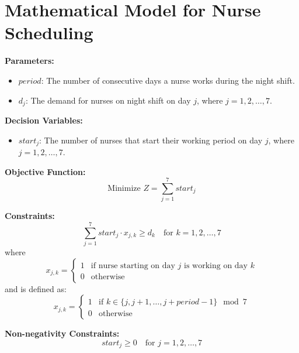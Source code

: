 \documentclass{article}
\begin{document}
\section*{Mathematical Model for Nurse Scheduling}

\textbf{Parameters:}
\begin{itemize}
    \item $period$: The number of consecutive days a nurse works during the night shift.
    \item $d_j$: The demand for nurses on night shift on day $j$, where $j = 1, 2, \ldots, 7$.
\end{itemize}

\textbf{Decision Variables:}
\begin{itemize}
    \item $start_j$: The number of nurses that start their working period on day $j$, where $j = 1, 2, \ldots, 7$.
\end{itemize}

\textbf{Objective Function:}
\[
\text{Minimize } Z = \sum_{j=1}^{7} start_j
\]

\textbf{Constraints:}
\begin{equation}
\sum_{j=1}^{7} start_j \cdot x_{j,k} \geq d_k \quad \text{for } k = 1, 2, \ldots, 7
\end{equation}
where 
\[
x_{j,k} = 
\begin{cases} 
1 & \text{if nurse starting on day } j \text{ is working on day } k \\
0 & \text{otherwise} 
\end{cases}
\]
and is defined as:
\[
x_{j,k} = 
\begin{cases} 
1 & \text{if } k \in \{j, j+1, \ldots, j + period - 1\} \mod 7\\
0 & \text{otherwise} 
\end{cases}
\]

\textbf{Non-negativity Constraints:}
\[
start_j \geq 0 \quad \text{for } j = 1, 2, \ldots, 7
\]
\end{document}
